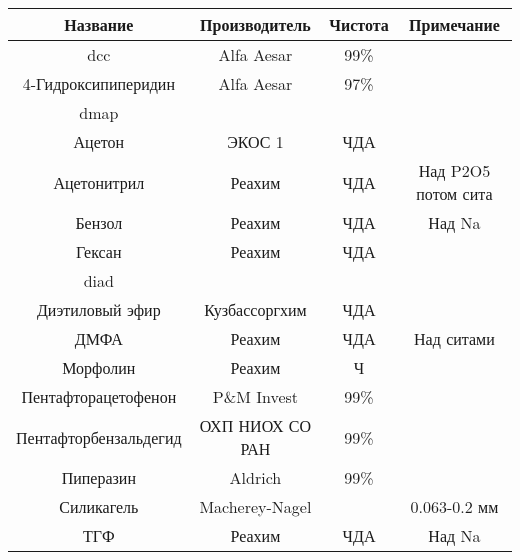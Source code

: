 \begin{table}[]
    \centering
    \caption{}
    \begin{small}
        \begin{tabular}{cccc}
            \toprule
            \textbf{Название}     & \textbf{Производитель} & \textbf{Чистота} & \textbf{Примечание} \\
            \midrule
            \ac{dcc}              & Alfa Aesar             & 99\%             &                     \\
            4-Гидроксипиперидин   & Alfa Aesar             & 97\%             &                     \\
            \ac{dmap}             &                        &                  &                     \\
            Ацетон                & ЭКОС 1                 & ЧДА              &                     \\
            Ацетонитрил           & Реахим                 & ЧДА              & Над P2O5 потом сита \\
            Бензол                & Реахим                 & ЧДА              & Над Na              \\
            Гексан                & Реахим                 & ЧДА              &                     \\
            \ac{diad}             &                        &                  &                     \\
            Диэтиловый эфир       & Кузбассоргхим          & ЧДА              &                     \\
            ДМФА                  & Реахим                 & ЧДА              & Над ситами          \\
            Морфолин              & Реахим                 & Ч                &                     \\
            Пентафторацетофенон   & P\&M Invest            & 99\%             &                     \\
            Пентафторбензальдегид & ОХП НИОХ СО РАН        & 99\%             &                     \\
            Пиперазин             & Aldrich                & 99\%             &                     \\
            Силикагель            & Macherey-Nagel         &                  & 0.063-0.2 мм        \\
            ТГФ                   & Реахим                 & ЧДА              & Над Na              \\

\end{tabular}
\end{small}
\end{table}

